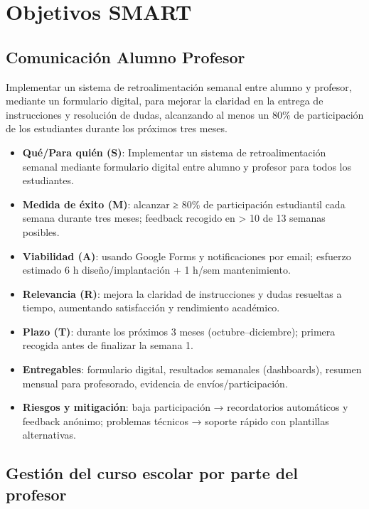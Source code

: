 \documentclass[
  spanish,
  11pt,
]{report}
\providecommand{\tightlist}{%
  \setlength{\itemsep}{0pt}\setlength{\parskip}{0pt}}
\begin{document}
\section{Objetivos SMART}\label{objetivos-smart}

\subsection{Comunicación Alumno
Profesor}\label{comunicaciuxf3n-alumno-profesor}

Implementar un sistema de retroalimentación semanal entre alumno y
profesor, mediante un formulario digital, para mejorar la claridad en la
entrega de instrucciones y resolución de dudas, alcanzando al menos un
80\% de participación de los estudiantes durante los próximos tres
meses.

\begin{itemize}
\tightlist
\item
  \textbf{Qué/Para quién (S)}: Implementar un sistema de
  retroalimentación semanal mediante formulario digital entre alumno y
  profesor para todos los estudiantes.
\item
  \textbf{Medida de éxito (M)}: alcanzar ≥ 80\% de participación
  estudiantil cada semana durante tres meses; feedback recogido en
  \textgreater{} 10 de 13 semanas posibles.
\item
  \textbf{Viabilidad (A)}: usando Google Forms y notificaciones por
  email; esfuerzo estimado 6 h diseño/implantación + 1 h/sem
  mantenimiento.
\item
  \textbf{Relevancia (R)}: mejora la claridad de instrucciones y dudas
  resueltas a tiempo, aumentando satisfacción y rendimiento académico.
\item
  \textbf{Plazo (T)}: durante los próximos 3 meses (octubre--diciembre);
  primera recogida antes de finalizar la semana 1.
\item
  \textbf{Entregables}: formulario digital, resultados semanales
  (dashboards), resumen mensual para profesorado, evidencia de
  envíos/participación.
\item
  \textbf{Riesgos y mitigación}: baja participación → recordatorios
  automáticos y feedback anónimo; problemas técnicos → soporte rápido
  con plantillas alternativas.
\end{itemize}

\subsection{Gestión del curso escolar por parte del
profesor}\label{gestiuxf3n-del-curso-escolar-por-parte-del-profesor}
\end{document}
